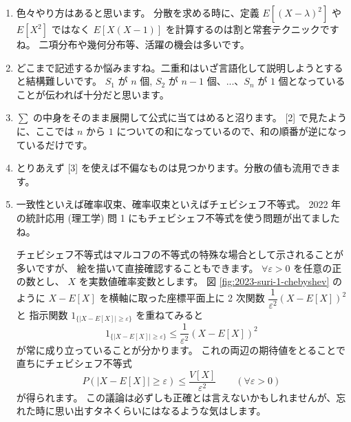 \documentclass[./main.tex]{subfiles}
\begin{document}
    \begin{enumerate}
        \item 色々やり方はあると思います。
        分散を求める時に、定義 $E[(X - \lambda)^2]$ や $E[X^2]$ ではなく $E[X(X - 1)]$ を計算するのは割と常套テクニックですね。
        二項分布や幾何分布等、活躍の機会は多いです。
        \item どこまで記述するか悩みますね。二重和はいざ言語化して説明しようとすると結構難しいです。
        $S_1$ が $n$ 個, $S_2$ が $n - 1$ 個、...、$S_n$ が $1$ 個となっていることが伝われば十分だと思います。
        \item $\displaystyle \sum$ の中身をそのまま展開して公式に当てはめると沼ります。
        [2] で見たように、ここでは $n$ から $1$ についての和になっているので、和の順番が逆になっているだけです。
        \item とりあえず [3] を使えば不偏なものは見つかります。分散の値も流用できます。
        \item 一致性といえば確率収束、確率収束といえばチェビシェフ不等式。
        2022 年の統計応用 (理工学) 問 1 にもチェビシェフ不等式を使う問題が出てましたね。

        チェビシェフ不等式はマルコフの不等式の特殊な場合として示されることが多いですが、
        絵を描いて直接確認することもできます。
        $\forall \varepsilon > 0$ を任意の正の数とし、 $X$ を実数値確率変数とします。
        図 \ref{fig:2023-suri-1-chebyshev} のように $X - E[X]$ を横軸に取った座標平面上に
        2 次関数 $\dfrac{1}{\varepsilon^2} ( X - E[X])^2 $ と
        指示関数 $1_{\{ \vert X - E[X] \vert \geq \varepsilon \}}$ を重ねてみると
        \begin{equation*}
            1_{ \{ \vert X - E[X] \vert \geq \varepsilon \}}
                \leq \frac{1}{\varepsilon^2} (X - E[X])^2
        \end{equation*}
        が常に成り立っていることが分かります。
        これの両辺の期待値をとることで直ちにチェビシェフ不等式
        \begin{equation*}
            P( \vert X - E[X] \vert \geq \varepsilon)
                \leq \frac{V [X]}{\varepsilon^2}
                \qquad (\forall \varepsilon > 0)
        \end{equation*}
        が得られます。
        この議論は必ずしも正確とは言えないかもしれませんが、忘れた時に思い出すタネくらいにはなるような気はします。

        \begin{figure}[tb]


\end{figure}
\end{enumerate}
\end{document}
